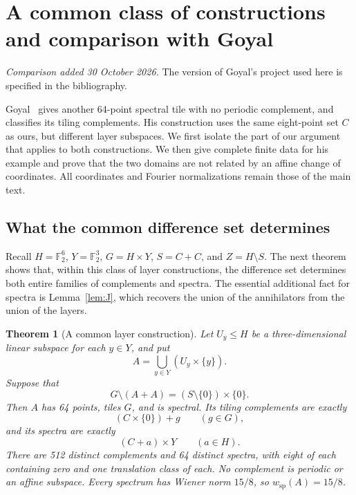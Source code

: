 \documentclass[11pt]{article}
\numberwithin{equation}{section}
\newtheorem{theorem}{Theorem}[section]
\theoremstyle{definition}
\theoremstyle{remark}\newtheorem{remark}[theorem]{Remark}
\newcommand{\F}{\mathbb F_2}
\newcommand{\wsp}{w_{\mathrm{sp}}}
\begin{document}
\clearpage
\appendix
\section{A common class of constructions and comparison with Goyal}
\label{app:comparison}

\emph{Comparison added 30 October 2026.} The version of Goyal's project
used here is specified in the bibliography.

Goyal~\cite{Goyal} gives another 64-point spectral tile with no periodic
complement, and classifies its tiling complements. His construction uses
the same eight-point set $C$ as ours, but different layer subspaces.
We first isolate the part of our argument that applies to both
constructions. We then give complete finite data for his example and
prove that the two domains are not related by an affine change of
coordinates. All coordinates and Fourier normalizations remain those
of the main text.

\subsection{What the common difference set determines}

Recall $H=\F^6$, $Y=\F^3$, $G=H\times Y$, $S=C+C$, and
$Z=H\setminus S$. The next theorem shows that, within this class of
layer constructions, the difference set determines both entire
families of complements and spectra. The essential additional fact
for spectra is Lemma~\ref{lem:J}, which recovers the union of the
annihilators from the union of the layers.

\begin{theorem}[A common layer construction]\label{thm:common-layers}
Let $U_y\le H$ be a three-dimensional linear subspace for each $y\in Y$,
and put
\[
 A=\bigcup_{y\in Y}(U_y\times\{y\}).
\]
Suppose that
\begin{equation}\label{eq:common-missing}
 G\setminus(A+A)=(S\setminus\{0\})\times\{0\}.
\end{equation}
Then $A$ has 64 points, tiles $G$, and is spectral. Its tiling complements
are exactly
\[
 (C\times\{0\})+g\qquad(g\in G),
\]
and its spectra are exactly
\[
 (C+a)\times Y\qquad(a\in H).
\]
There are 512 distinct complements and 64 distinct spectra, with eight
of each containing zero and one translation class of each. No complement
is periodic or an affine subspace. Every spectrum has Wiener norm
$15/8$, so $\wsp(A)=15/8$.
\end{theorem}
\end{document}
